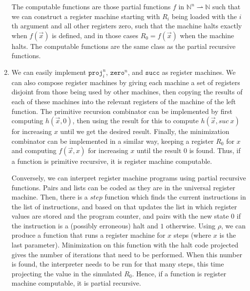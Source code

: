 \documentclass{article}
\newcommand{\parto}{\rightharpoonup}
\begin{document}
\begin{enumerate}
    The computable functions are those partial functions $f$ in $\mathbb N^n \parto \mathbb N$ such that we can construct a register machine starting with $R_i$ being loaded with the $i$th argument and all other registers zero, such that the machine halts exactly when $f(\vec x)$ is defined, and in those cases $R_0 = f(\vec x)$ when the machine halts. The computable functions are the same class as the partial recursive functions.
  \item We can easily implement $\mathtt{proj}_i^n$, $\mathtt{zero}^n$, and $\mathtt{succ}$ as register machines. We can also compose register machines by giving each machine a set of registers disjoint from those being used by other machines, then copying the results of each of these machines into the relevant registers of the machine of the left function. The primitive recursion combinator can be implemented by first computing $h(\vec x, 0)$, then using the result for this to compute $h(\vec x, \mathit{suc}~x)$ for increasing $x$ until we get the desired result. Finally, the minimization combinator can be implemented in a similar way, keeping a register $R_0$ for $x$ and computing $f(\vec x, x)$ for increasing $x$ until the result $0$ is found. Thus, if a function is primitive recursive, it is register machine computable.

    Conversely, we can interpret register machine programs using partial recursive functions. Pairs and lists can be coded as they are in the universal register machine. Then, there is a $\mathit{step}$ function which finds the current instructions in the list of instructions, and based on that updates the list in which register values are stored and the program counter, and pairs with the new state $0$ if the instruction is a (possibly erroneous) halt and $1$ otherwise. Using $\rho$, we can produce a function that runs a register machine for $x$ steps (where $x$ is the last parameter). Minimization on this function with the halt code projected gives the number of iterations that need to be performed. When this number is found, the interpreter needs to be run for that many steps, this time projecting the value in the simulated $R_0$. Hence, if a function is register machine computable, it is partial recursive.
\end{enumerate}
\end{document}
